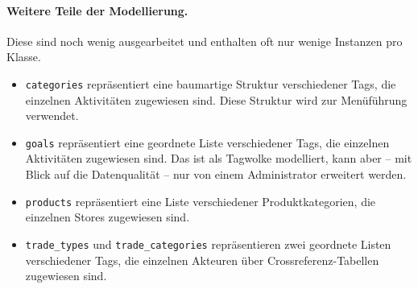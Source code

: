 \documentclass[a4paper,11pt]{article}
\begin{document}
\paragraph{Weitere Teile der Modellierung.}
Diese sind noch wenig ausgearbeitet und enthalten oft nur wenige Instanzen pro
Klasse. 
\begin{itemize}\itemsep0pt
\item \texttt{categories} repräsentiert eine baumartige Struktur verschiedener
  Tags, die einzelnen Aktivitäten zugewiesen sind.  Diese Struktur wird zur
  Menüführung verwendet. 
\item \texttt{goals} repräsentiert eine geordnete Liste verschiedener Tags, die
  einzelnen Aktivitäten zugewiesen sind. Das ist als Tagwolke modelliert, kann
  aber -- mit Blick auf die Datenqualität -- nur von einem Administrator
  erweitert werden.
\item \texttt{products} repräsentiert eine Liste verschiedener
  Produktkategorien, die einzelnen Stores zugewiesen sind.
\item \texttt{trade\_types} und \texttt{trade\_categories} repräsentieren zwei
  geordnete Listen verschiedener Tags, die einzelnen Akteuren über 
  Crossreferenz-Tabellen zugewiesen sind.
\end{itemize}
\end{document}
